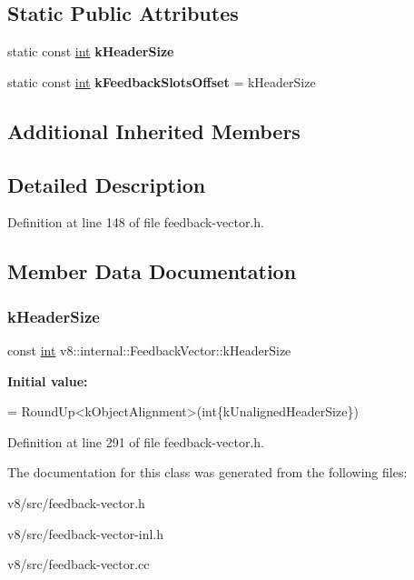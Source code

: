 \subsection*{Static Public Attributes}
\begin{DoxyCompactItemize}
\item 
static const \mbox{\hyperlink{classint}{int}} {\bfseries k\+Header\+Size}
\item 
\mbox{\label{classv8_1_1internal_1_1FeedbackVector_a9eb2b328b43c8a269b65a6e8f4674ddd}} 
static const \mbox{\hyperlink{classint}{int}} {\bfseries k\+Feedback\+Slots\+Offset} = k\+Header\+Size
\end{DoxyCompactItemize}
\subsection*{Additional Inherited Members}


\subsection{Detailed Description}


Definition at line 148 of file feedback-\/vector.\+h.



\subsection{Member Data Documentation}
\mbox{\label{classv8_1_1internal_1_1FeedbackVector_af4c6f205e9fb95c671afe34ff7071c18}} 
\subsubsection{\texorpdfstring{k\+Header\+Size}{kHeaderSize}}
{\footnotesize\ttfamily const \mbox{\hyperlink{classint}{int}} v8\+::internal\+::\+Feedback\+Vector\+::k\+Header\+Size\hspace{0.3cm}{\ttfamily [static]}}

{\bfseries Initial value\+:}
\begin{DoxyCode}
=
      RoundUp<kObjectAlignment>(\textcolor{keywordtype}{int}\{kUnalignedHeaderSize\})
\end{DoxyCode}


Definition at line 291 of file feedback-\/vector.\+h.



The documentation for this class was generated from the following files\+:\begin{DoxyCompactItemize}
\item 
v8/src/feedback-\/vector.\+h\item 
v8/src/feedback-\/vector-\/inl.\+h\item 
v8/src/feedback-\/vector.\+cc\end{DoxyCompactItemize}
